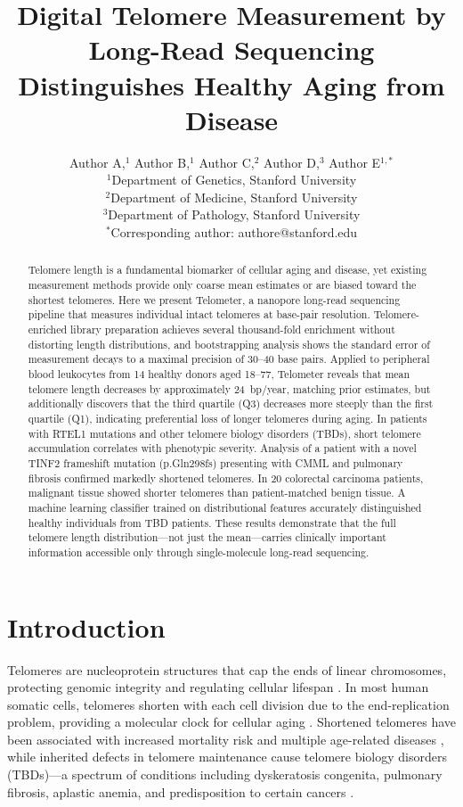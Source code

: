 \documentclass[11pt]{article}
\title{Digital Telomere Measurement by Long-Read Sequencing Distinguishes Healthy Aging from Disease}
\author{Author A,$^{1}$ Author B,$^{1}$ Author C,$^{2}$ Author D,$^{3}$ Author E$^{1,*}$\\
\small $^{1}$Department of Genetics, Stanford University\\
\small $^{2}$Department of Medicine, Stanford University\\
\small $^{3}$Department of Pathology, Stanford University\\
\small $^{*}$Corresponding author: authore@stanford.edu}
\date{}
\begin{document}
\maketitle

\begin{abstract}
Telomere length is a fundamental biomarker of cellular aging and disease, yet existing measurement methods provide only coarse mean estimates or are biased toward the shortest telomeres. Here we present Telometer, a nanopore long-read sequencing pipeline that measures individual intact telomeres at base-pair resolution. Telomere-enriched library preparation achieves several thousand-fold enrichment without distorting length distributions, and bootstrapping analysis shows the standard error of measurement decays to a maximal precision of 30--40 base pairs. Applied to peripheral blood leukocytes from 14 healthy donors aged 18--77, Telometer reveals that mean telomere length decreases by approximately 24~bp/year, matching prior estimates, but additionally discovers that the third quartile (Q3) decreases more steeply than the first quartile (Q1), indicating preferential loss of longer telomeres during aging. In patients with RTEL1 mutations and other telomere biology disorders (TBDs), short telomere accumulation correlates with phenotypic severity. Analysis of a patient with a novel TINF2 frameshift mutation (p.Gln298fs) presenting with CMML and pulmonary fibrosis confirmed markedly shortened telomeres. In 20 colorectal carcinoma patients, malignant tissue showed shorter telomeres than patient-matched benign tissue. A machine learning classifier trained on distributional features accurately distinguished healthy individuals from TBD patients. These results demonstrate that the full telomere length distribution---not just the mean---carries clinically important information accessible only through single-molecule long-read sequencing.
\end{abstract}

\section{Introduction}

Telomeres are nucleoprotein structures that cap the ends of linear chromosomes, protecting genomic integrity and regulating cellular lifespan \citep{blackburn2001telomere}. In most human somatic cells, telomeres shorten with each cell division due to the end-replication problem, providing a molecular clock for cellular aging \citep{harley1990telomeres}. Shortened telomeres have been associated with increased mortality risk and multiple age-related diseases \citep{delong2004telomere}, while inherited defects in telomere maintenance cause telomere biology disorders (TBDs)---a spectrum of conditions including dyskeratosis congenita, pulmonary fibrosis, aplastic anemia, and predisposition to certain cancers \citep{armanios2012telomerase, savage2014beginning}.
\end{document}
